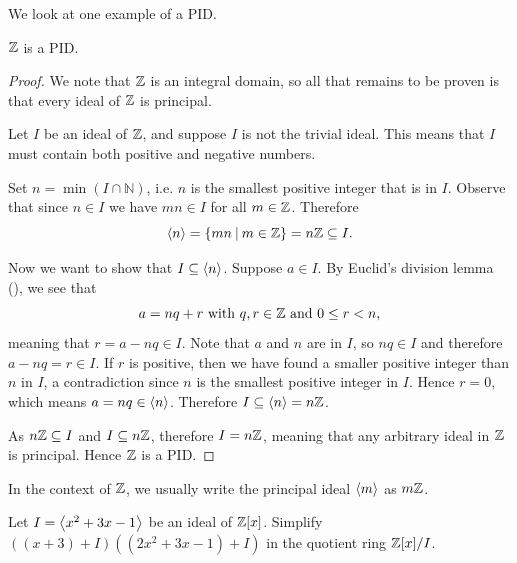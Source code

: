We look at one example of a PID.
\begin{proposition}
    $\mathbb{Z}$ is a PID.
\end{proposition}
\begin{proof}
    We note that $\mathbb{Z}$ is an integral domain, so all that remains to be proven is that every ideal of $\mathbb{Z}$ is principal.

    Let $I$ be an ideal of $\mathbb{Z}$, and suppose $I$ is not the trivial ideal. This means that $I$ must contain both positive and negative numbers.
    
    Set $n = \min(I \cap \mathbb{N})$, i.e. $n$ is the smallest positive integer that is in $I$. Observe that since $n \in I$ we have $mn \in I$ for all $m \in \mathbb{Z}$. Therefore
    \[
        \princ{n} = \{mn \vert m \in \Z\} = n\Z \subseteq I.
    \]

    Now we want to show that $I \subseteq \left\langle n\right\rangle$. Suppose $a \in I$. By Euclid's division lemma (), we see that
    \[
        a = nq + r \text{ with } q,r\in\mathbb{Z} \text{ and } 0 \leq r < n,
    \]
    meaning that $r = a - nq \in I$. Note that $a$ and $n$ are in $I$, so $nq \in I$ and therefore $a - nq = r \in I$. If $r$ is positive, then we have found a smaller positive integer than $n$ in $I$, a contradiction since $n$ is the smallest positive integer in $I$. Hence $r = 0$, which means $a = nq \in \left\langle n\right\rangle$. Therefore $I \subseteq \left\langle n\right\rangle = n\mathbb{Z}$.

    As $n\mathbb{Z} \subseteq I$ and $I \subseteq n\mathbb{Z}$, therefore $I = n\mathbb{Z}$, meaning that any arbitrary ideal in $\mathbb{Z}$ is principal. Hence $\mathbb{Z}$ is a PID.
\end{proof}
\begin{remark}
    In the context of $\mathbb{Z}$, we usually write the principal ideal $\left\langle m\right\rangle$ as $m\mathbb{Z}$.
\end{remark}
\begin{exercise}
    Let $I = \left\langle x^2 + 3x - 1\right\rangle$ be an ideal of $\mathbb{Z}[x]$. Simplify $\left((x + 3) + I\right)\left((2x^2 + 3x - 1) + I\right)$ in the quotient ring $\mathbb{Z}[x]/I$.
\end{exercise}

